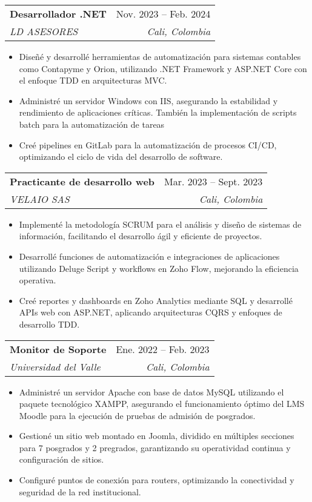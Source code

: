 \documentclass[letterpaper,11pt]{article}
\makeatletter
\newcommand{\resumeItem}[1]{
  \item\small{
    {#1 \vspace{-2pt}}
  }
}
\newcommand{\resumeSubheading}[4]{
  \vspace{-2pt}\item
    \begin{tabular*}{0.97\textwidth}[t]{l@{\extracolsep{\fill}}r}
      \textbf{#1} & #2 \\
      \textit{\small#3} & \textit{\small #4} \\
    \end{tabular*}\vspace{-7pt}
}
\newcommand{\resumeSubSubheading}[2]{
    \item
    \begin{tabular*}{0.97\textwidth}{l@{\extracolsep{\fill}}r}
      \textit{\small#1} & \textit{\small #2} \\
    \end{tabular*}\vspace{-7pt}
}
\newcommand{\resumeSubHeadingListEnd}{\end{itemize}}
\newcommand{\resumeItemListStart}{\begin{itemize}}
\newcommand{\resumeItemListEnd}{\end{itemize}\vspace{-5pt}}
\makeatother
\begin{document}
  \resumeSubheading
    {Desarrollador .NET}{Nov. 2023 -- Feb. 2024}
    {LD ASESORES}{Cali, Colombia}
    \resumeItemListStart
      \resumeItem{Diseñé y desarrollé herramientas de automatización para sistemas contables como Contapyme y Orion, utilizando .NET Framework y ASP.NET Core con el enfoque TDD en arquitecturas MVC.}
      \resumeItem{Administré un servidor Windows con IIS, asegurando la estabilidad y rendimiento de aplicaciones críticas. También la implementación de scripts batch para la automatización de tareas}
      \resumeItem{Creé pipelines en GitLab para la automatización de procesos CI/CD, optimizando el ciclo de vida del desarrollo de software.}
    \resumeItemListEnd

    \resumeSubheading
    {Practicante de desarrollo web}{Mar. 2023 -- Sept. 2023}
    {VELAIO SAS}{Cali, Colombia}
    \resumeItemListStart
      \resumeItem{Implementé la metodología SCRUM para el análisis y diseño de sistemas de información, facilitando el desarrollo ágil y eficiente de proyectos.}
      \resumeItem{Desarrollé funciones de automatización e integraciones de aplicaciones utilizando Deluge Script y workflows en Zoho Flow, mejorando la eficiencia operativa.}
      \resumeItem{Creé reportes y dashboards en Zoho Analytics mediante SQL y desarrollé APIs web con ASP.NET, aplicando arquitecturas CQRS y enfoques de desarrollo TDD.}
    \resumeItemListEnd

    \resumeSubheading
    {Monitor de Soporte}{Ene. 2022 -- Feb. 2023}
    {Universidad del Valle}{Cali, Colombia}
    \resumeItemListStart
      \resumeItem{Administré un servidor Apache con base de datos MySQL utilizando el paquete tecnológico XAMPP, asegurando el funcionamiento óptimo del LMS Moodle para la ejecución de pruebas de admisión de posgrados.}
      \resumeItem{Gestioné un sitio web montado en Joomla, dividido en múltiples secciones para 7 posgrados y 2 pregrados, garantizando su operatividad continua y configuración  de sitios.}
      \resumeItem{Configuré puntos de conexión para routers, optimizando la conectividad y seguridad de la red institucional.}
    \resumeItemListEnd
      
\end{document}

